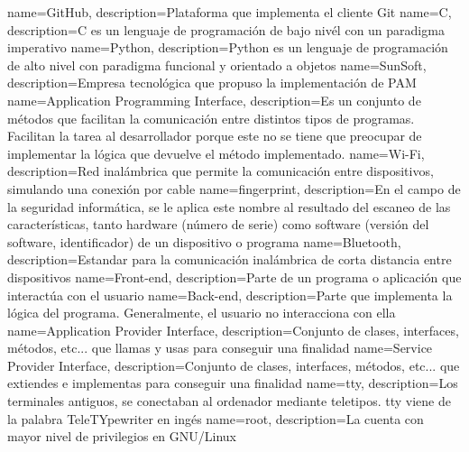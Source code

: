 {
	name=GitHub,
	description={Plataforma que implementa el cliente Git}
}
{
	name=C,
	description={C es un lenguaje de programación de bajo nivél con un paradigma imperativo}
}
{
	name=Python,
	description={Python es un lenguaje de programación de alto nivel con paradigma funcional y orientado a objetos}
}
{
	name=SunSoft,
	description={Empresa tecnológica que propuso la implementación de PAM}
}
{
	name=Application Programming Interface,
	description={Es un conjunto de métodos que facilitan la comunicación entre distintos tipos de programas. Facilitan la tarea al desarrollador porque este no se tiene que preocupar de implementar la lógica que devuelve el método implementado.}
}
{
	name=Wi-Fi,
	description={Red inalámbrica que permite la comunicación entre dispositivos, simulando una conexión por cable}
}
{
	name=fingerprint,
	description={En el campo de la seguridad informática, se le aplica este nombre al resultado del escaneo de las características, tanto hardware (número de serie) como software (versión del software, identificador) de un dispositivo o programa}
}
{
	name=Bluetooth,
	description={Estandar para la comunicación inalámbrica de corta distancia entre dispositivos}
}
{
	name=Front-end,
	description={Parte de un programa o aplicación que interactúa con el usuario}
}
{
	name=Back-end,
	description={Parte que implementa la lógica del programa. Generalmente, el usuario no interacciona con ella}
}
{
	name=Application Provider Interface,
	description={Conjunto de clases, interfaces, métodos, etc... que llamas y usas para conseguir una finalidad}
}
{
	name=Service Provider Interface,
	description={Conjunto de clases, interfaces, métodos, etc... que extiendes e implementas para conseguir una finalidad}
}
{
	name=tty,
	description={Los terminales antiguos, se conectaban al ordenador mediante teletipos. tty viene de la palabra TeleTYpewriter en ingés}
}
{
	name=root,
	description={La cuenta con mayor nivel de privilegios en GNU/Linux}
}
